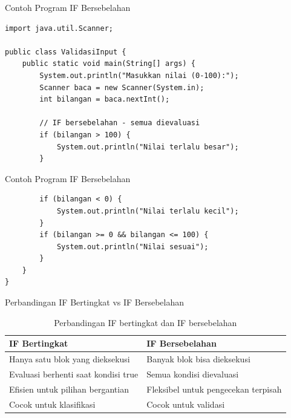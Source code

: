 \documentclass{beamer}
\begin{document}
\begin{frame}[fragile]{Contoh Program IF Bersebelahan}
\begin{lstlisting}
import java.util.Scanner;

public class ValidasiInput {
    public static void main(String[] args) {
        System.out.println("Masukkan nilai (0-100):");
        Scanner baca = new Scanner(System.in);
        int bilangan = baca.nextInt();
        
        // IF bersebelahan - semua dievaluasi
        if (bilangan > 100) {
            System.out.println("Nilai terlalu besar");
        }
\end{lstlisting}
\end{frame}

\begin{frame}[fragile]{Contoh Program IF Bersebelahan}
\begin{lstlisting}
        if (bilangan < 0) {
            System.out.println("Nilai terlalu kecil");
        }
        if (bilangan >= 0 && bilangan <= 100) {
            System.out.println("Nilai sesuai");
        }
    }
}
\end{lstlisting}
\end{frame}

\begin{frame}{Perbandingan IF Bertingkat vs IF Bersebelahan}
  \begin{table}
    \footnotesize
    \begin{tabular}{p{}|p{}}
    \textbf{IF Bertingkat} & \textbf{IF Bersebelahan} \\
    \hline
    \rowcolor{lightgray}
    Hanya satu blok yang dieksekusi & Banyak blok bisa dieksekusi \\
    \rowcolor{white}
    Evaluasi berhenti saat kondisi true & Semua kondisi dievaluasi \\
    \rowcolor{lightgray}
    Efisien untuk pilihan bergantian & Fleksibel untuk pengecekan terpisah \\
    \rowcolor{white}
    Cocok untuk klasifikasi & Cocok untuk validasi \\
    \end{tabular}
    \caption{Perbandingan IF bertingkat dan IF bersebelahan}
  \end{table}
\end{frame}

\end{document}
